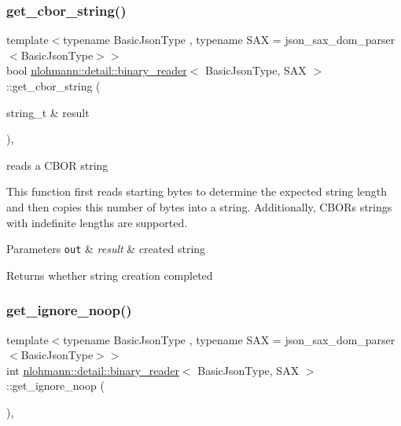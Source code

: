 \subsubsection{\texorpdfstring{get\+\_\+cbor\+\_\+string()}{get\_cbor\_string()}}
{\footnotesize\ttfamily template$<$typename Basic\+Json\+Type , typename S\+AX  = json\+\_\+sax\+\_\+dom\+\_\+parser$<$\+Basic\+Json\+Type$>$$>$ \\
bool \mbox{\hyperlink{classnlohmann_1_1detail_1_1binary__reader}{nlohmann\+::detail\+::binary\+\_\+reader}}$<$ Basic\+Json\+Type, S\+AX $>$\+::get\+\_\+cbor\+\_\+string (\begin{DoxyParamCaption}\item[{string\+\_\+t \&}]{result }\end{DoxyParamCaption})\hspace{0.3cm}{\ttfamily [inline]}, {\ttfamily [private]}}



reads a C\+B\+OR string 

This function first reads starting bytes to determine the expected string length and then copies this number of bytes into a string. Additionally, C\+B\+OR\textquotesingle{}s strings with indefinite lengths are supported.


\begin{DoxyParams}[1]{Parameters}
\mbox{\tt out}  & {\em result} & created string\\
\hline
\end{DoxyParams}
\begin{DoxyReturn}{Returns}
whether string creation completed 
\end{DoxyReturn}
\mbox{\label{classnlohmann_1_1detail_1_1binary__reader_a11a145292c1cc44656c34a6aef38759c}} 
\subsubsection{\texorpdfstring{get\+\_\+ignore\+\_\+noop()}{get\_ignore\_noop()}}
{\footnotesize\ttfamily template$<$typename Basic\+Json\+Type , typename S\+AX  = json\+\_\+sax\+\_\+dom\+\_\+parser$<$\+Basic\+Json\+Type$>$$>$ \\
int \mbox{\hyperlink{classnlohmann_1_1detail_1_1binary__reader}{nlohmann\+::detail\+::binary\+\_\+reader}}$<$ Basic\+Json\+Type, S\+AX $>$\+::get\+\_\+ignore\+\_\+noop (\begin{DoxyParamCaption}{ }\end{DoxyParamCaption})\hspace{0.3cm}{\ttfamily [inline]}, {\ttfamily [private]}}

